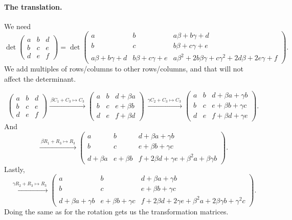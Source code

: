 \paragraph{The translation.} We need
\[
\det \begin{pmatrix} a & b & d \\ b & c & e \\ d & e & f \end{pmatrix}
= \det \begin{pmatrix} a & b & a\beta + b\gamma + d \\ b & c & b\beta + c\gamma + e \\ a\beta + b\gamma + d & b\beta + c\gamma + e & a\beta^2 + 2b\beta\gamma + c\gamma^2 + 2d\beta + 2e\gamma + f \end{pmatrix}.
\]
We add multiples of rows/columns to other rows/columns, and that will not affect the determinant.

\begin{calc}
\[
\begin{pmatrix} a & b & d \\ b & c & e \\ d & e & f \end{pmatrix}
\xrightarrow{\ \beta C_1 + C_3 \mapsto C_3\ }
\begin{pmatrix} a & b & d + \beta a \\ b & c & e + \beta b \\ d & e & f + \beta d \end{pmatrix}
\xrightarrow{\ \gamma C_2 + C_3 \mapsto C_3\ }
\begin{pmatrix} a & b & d + \beta a + \gamma b \\ b & c & e + \beta b + \gamma c \\ d & e & f + \beta d + \gamma e \end{pmatrix}.
\]
And
\[
\xrightarrow{\ \beta R_1 + R_3 \mapsto R_3\ }
\begin{pmatrix} a & b & d + \beta a + \gamma b \\ b & c & e + \beta b + \gamma c \\ d + \beta a & e + \beta b & f + 2\beta d + \gamma e + \beta^2 a + \beta\gamma b \end{pmatrix}.
\]
Lastly,
\[
\xrightarrow{\ \gamma R_2 + R_3 \mapsto R_3\ }
\begin{pmatrix} a & b & d + \beta a + \gamma b \\ b & c & e + \beta b + \gamma c \\ d + \beta a + \gamma b & e + \beta b + \gamma c & f + 2\beta d + 2\gamma e + \beta^2 a + 2\beta\gamma b + \gamma^2 c \end{pmatrix}.
\]
Doing the same as for the rotation gets us the transformation matrices.
\end{calc}


